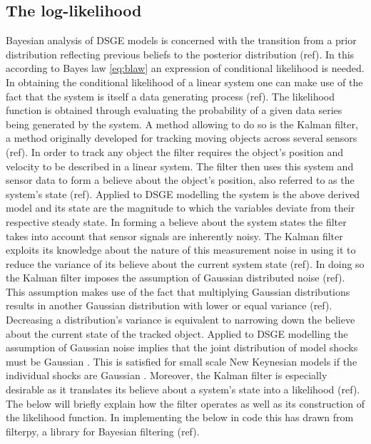 \documentclass[12pt,a4paper,english]{article} %
\begin{document}
		
	\subsection{The log-likelihood}
	Bayesian analysis of DSGE models is concerned with the transition from a prior distribution reflecting previous beliefs to the posterior distribution (ref). In this according to Bayes law \ref{eq:blaw} an expression of conditional likelihood is needed. 
	In obtaining the conditional likelihood of a linear system one can make use of the fact that the system is itself a data generating process (ref). The likelihood function is obtained through evaluating the probability of a given data series being generated by the system. 
	A method allowing to do so is the Kalman filter, a method originally developed for tracking moving objects across several sensors (ref). In order to track any object the filter requires the object's position and velocity to be described in a linear system. The filter then uses this system and sensor data to form a believe about the object's position, also referred to as the system's state (ref). Applied to DSGE modelling the system is the above derived model and its state are the magnitude to which the variables deviate from their respective steady state.	
	In forming a believe about the system states the filter takes into account that sensor signals are inherently noisy. The Kalman filter exploits its knowledge about the nature of this measurement noise in using it to reduce the variance of its believe about the current system state (ref). In doing so the Kalman filter imposes the assumption of Gaussian distributed noise (ref). This assumption makes use of the fact that multiplying Gaussian distributions results in another Gaussian distribution with lower or equal variance (ref). Decreasing a distribution's variance is equivalent to narrowing down the believe about the current state of the tracked object. Applied to DSGE modelling the assumption of Gaussian noise implies that the joint distribution of model shocks must be Gaussian \cite{herbst_bayesian_2016}. This is satisfied for small scale New Keynesian models if the individual shocks are Gaussian \cite{herbst_bayesian_2016}. 	
	Moreover, the Kalman filter is especially desirable as it translates its believe about a system's state into a likelihood (ref). The below will briefly explain how the filter operates as well as its construction of the likelihood function. In implementing the below in code this has drawn from filterpy, a library for Bayesian filtering (ref).
	
\end{document}
